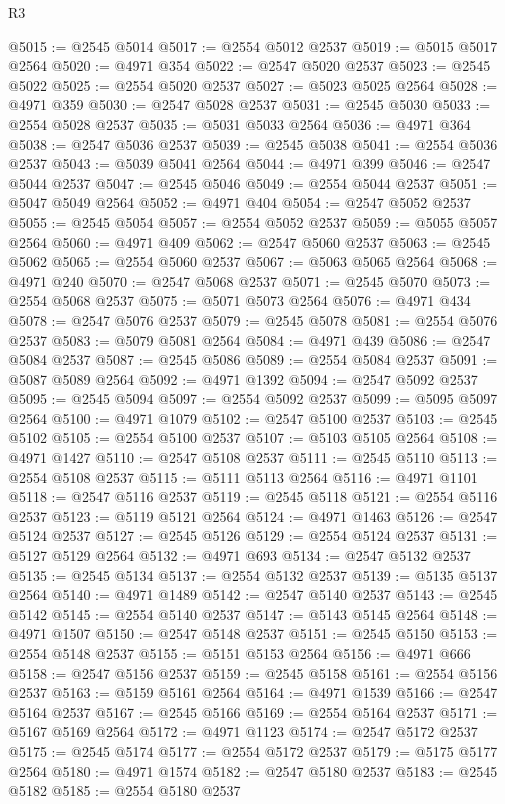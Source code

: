 \begin{lexlean}{R3}
\begin{coremodule}
@5015 := @2545 @5014
@5017 := @2554 @5012 @2537
@5019 := @5015 @5017 @2564
@5020 := @4971 @354
@5022 := @2547 @5020 @2537
@5023 := @2545 @5022
@5025 := @2554 @5020 @2537
@5027 := @5023 @5025 @2564
@5028 := @4971 @359
@5030 := @2547 @5028 @2537
@5031 := @2545 @5030
@5033 := @2554 @5028 @2537
@5035 := @5031 @5033 @2564
@5036 := @4971 @364
@5038 := @2547 @5036 @2537
@5039 := @2545 @5038
@5041 := @2554 @5036 @2537
@5043 := @5039 @5041 @2564
@5044 := @4971 @399
@5046 := @2547 @5044 @2537
@5047 := @2545 @5046
@5049 := @2554 @5044 @2537
@5051 := @5047 @5049 @2564
@5052 := @4971 @404
@5054 := @2547 @5052 @2537
@5055 := @2545 @5054
@5057 := @2554 @5052 @2537
@5059 := @5055 @5057 @2564
@5060 := @4971 @409
@5062 := @2547 @5060 @2537
@5063 := @2545 @5062
@5065 := @2554 @5060 @2537
@5067 := @5063 @5065 @2564
@5068 := @4971 @240
@5070 := @2547 @5068 @2537
@5071 := @2545 @5070
@5073 := @2554 @5068 @2537
@5075 := @5071 @5073 @2564
@5076 := @4971 @434
@5078 := @2547 @5076 @2537
@5079 := @2545 @5078
@5081 := @2554 @5076 @2537
@5083 := @5079 @5081 @2564
@5084 := @4971 @439
@5086 := @2547 @5084 @2537
@5087 := @2545 @5086
@5089 := @2554 @5084 @2537
@5091 := @5087 @5089 @2564
@5092 := @4971 @1392
@5094 := @2547 @5092 @2537
@5095 := @2545 @5094
@5097 := @2554 @5092 @2537
@5099 := @5095 @5097 @2564
@5100 := @4971 @1079
@5102 := @2547 @5100 @2537
@5103 := @2545 @5102
@5105 := @2554 @5100 @2537
@5107 := @5103 @5105 @2564
@5108 := @4971 @1427
@5110 := @2547 @5108 @2537
@5111 := @2545 @5110
@5113 := @2554 @5108 @2537
@5115 := @5111 @5113 @2564
@5116 := @4971 @1101
@5118 := @2547 @5116 @2537
@5119 := @2545 @5118
@5121 := @2554 @5116 @2537
@5123 := @5119 @5121 @2564
@5124 := @4971 @1463
@5126 := @2547 @5124 @2537
@5127 := @2545 @5126
@5129 := @2554 @5124 @2537
@5131 := @5127 @5129 @2564
@5132 := @4971 @693
@5134 := @2547 @5132 @2537
@5135 := @2545 @5134
@5137 := @2554 @5132 @2537
@5139 := @5135 @5137 @2564
@5140 := @4971 @1489
@5142 := @2547 @5140 @2537
@5143 := @2545 @5142
@5145 := @2554 @5140 @2537
@5147 := @5143 @5145 @2564
@5148 := @4971 @1507
@5150 := @2547 @5148 @2537
@5151 := @2545 @5150
@5153 := @2554 @5148 @2537
@5155 := @5151 @5153 @2564
@5156 := @4971 @666
@5158 := @2547 @5156 @2537
@5159 := @2545 @5158
@5161 := @2554 @5156 @2537
@5163 := @5159 @5161 @2564
@5164 := @4971 @1539
@5166 := @2547 @5164 @2537
@5167 := @2545 @5166
@5169 := @2554 @5164 @2537
@5171 := @5167 @5169 @2564
@5172 := @4971 @1123
@5174 := @2547 @5172 @2537
@5175 := @2545 @5174
@5177 := @2554 @5172 @2537
@5179 := @5175 @5177 @2564
@5180 := @4971 @1574
@5182 := @2547 @5180 @2537
@5183 := @2545 @5182
@5185 := @2554 @5180 @2537

\end{coremodule}
\end{lexlean}
